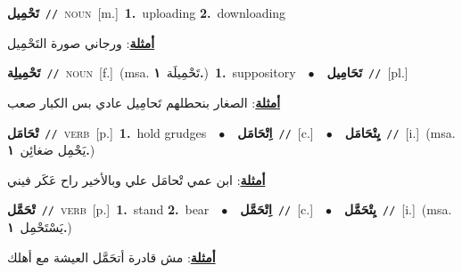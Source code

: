 \documentclass[10pt,a4paper,twoside]{article} %
\begin{document}
\begin{multicols}{2}
{\setlength\topsep{0pt}\textbf{\foreignlanguage{arabic}{تَحْمِيل}}\ {\color{gray}\texttt{//}\color{black}}\ \textsc{noun}\ [m.]\ \textbf{1.}~uploading  \textbf{2.}~downloading\  \begin{flushright}\color{gray}\foreignlanguage{arabic}{\textbf{\underline{\foreignlanguage{arabic}{أمثلة}}}: ورجاني صورة التَحْمِيل}\end{flushright}\color{black}} \vspace{2mm}

{\setlength\topsep{0pt}\textbf{\foreignlanguage{arabic}{تَحْمِيلِة}}\ {\color{gray}\texttt{//}\color{black}}\ \textsc{noun}\ [f.]\ \color{gray}(msa. \foreignlanguage{arabic}{تَحْمِيلَة}~\foreignlanguage{arabic}{\textbf{١.}})\color{black}\ \textbf{1.}~suppository\ \ $\bullet$\ \ \setlength\topsep{0pt}\textbf{\foreignlanguage{arabic}{تَحَامِيل}}\ {\color{gray}\texttt{//}\color{black}}\ [pl.]\  \begin{flushright}\color{gray}\foreignlanguage{arabic}{\textbf{\underline{\foreignlanguage{arabic}{أمثلة}}}: الصغار بنحطلهم تَحامِيل عادي بس الكبار صعب}\end{flushright}\color{black}} \vspace{2mm}

{\setlength\topsep{0pt}\textbf{\foreignlanguage{arabic}{تْحَامَل}}\ {\color{gray}\texttt{//}\color{black}}\ \textsc{verb}\ [p.]\ \textbf{1.}~hold grudges\ \ $\bullet$\ \ \setlength\topsep{0pt}\textbf{\foreignlanguage{arabic}{اِتْحَامَل}}\ {\color{gray}\texttt{//}\color{black}}\ [c.]\ \ $\bullet$\ \ \setlength\topsep{0pt}\textbf{\foreignlanguage{arabic}{يِتْحَامَل}}\ {\color{gray}\texttt{//}\color{black}}\ [i.]\ \color{gray}(msa. \foreignlanguage{arabic}{يَحْمِل ضغائِن}~\foreignlanguage{arabic}{\textbf{١.}})\color{black}\  \begin{flushright}\color{gray}\foreignlanguage{arabic}{\textbf{\underline{\foreignlanguage{arabic}{أمثلة}}}: ابن عمي تْحامَل علي وبالأخير راح عَكَر فيني}\end{flushright}\color{black}} \vspace{2mm}

{\setlength\topsep{0pt}\textbf{\foreignlanguage{arabic}{تْحَمَّل}}\ {\color{gray}\texttt{//}\color{black}}\ \textsc{verb}\ [p.]\ \textbf{1.}~stand  \textbf{2.}~bear\ \ $\bullet$\ \ \setlength\topsep{0pt}\textbf{\foreignlanguage{arabic}{اِتْحَمَّل}}\ {\color{gray}\texttt{//}\color{black}}\ [c.]\ \ $\bullet$\ \ \setlength\topsep{0pt}\textbf{\foreignlanguage{arabic}{يِتْحَمَّل}}\ {\color{gray}\texttt{//}\color{black}}\ [i.]\ \color{gray}(msa. \foreignlanguage{arabic}{يَسْتَحْمِل}~\foreignlanguage{arabic}{\textbf{١.}})\color{black}\  \begin{flushright}\color{gray}\foreignlanguage{arabic}{\textbf{\underline{\foreignlanguage{arabic}{أمثلة}}}: مش قادرة أتحَمَّل العيشة مع أهلك}\end{flushright}\color{black}} \vspace{2mm}


\end{multicols}
\end{document}
